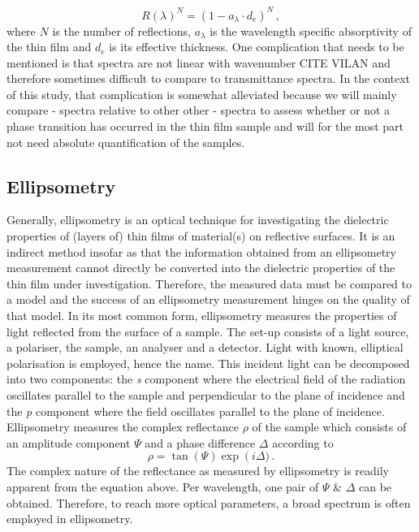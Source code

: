 \begin{equation}
\label{atr-reflectance}
	R(\lambda)^N = (1-a_{\lambda} \cdot d_e)^N \, ,
\end{equation}
where $N$ is the number of reflections, $a_{\lambda}$ is the wavelength specific absorptivity of the thin film and $d_e$ is its effective thickness. One complication that needs to be mentioned is that \atr{} spectra are not linear with wavenumber CITE VILAN and therefore sometimes difficult to compare to transmittance spectra. In the context of this study, that complication is somewhat alleviated because we will mainly compare \atr{}-\ftir{} spectra relative to other other \atr{}-\ftir{} spectra to assess whether or not a phase transition has occurred in the thin film sample and will for the most part not need absolute quantification of the samples.
\subsection{Ellipsometry}
Generally, ellipsometry is an optical technique for investigating the dielectric properties of (layers of) thin films of material(s) on reflective surfaces. It is an indirect method insofar as that the information obtained from an ellipsometry measurement cannot directly be converted into the dielectric properties of the thin film under investigation. Therefore, the measured data must be compared to a model and the success of an ellipsometry measurement hinges on the quality of that model. In its most common form, ellipsometry measures the properties of light reflected from the surface of a sample. The set-up consists of a light source, a polariser, the sample, an analyser and a detector. Light with known, elliptical polarisation is employed, hence the name. This incident light can be decomposed into two components: the \emph{s} component where the electrical field of the radiation oscillates parallel to the sample and perpendicular to the plane of incidence and the \emph{p} component where the field oscillates parallel to the plane of incidence. Ellipsometry measures the complex reflectance $\rho$ of the sample which consists of an amplitude component $\Psi$ and a phase difference $\Delta$ according to
\begin{equation}
	\rho = \tan \left( \Psi \right) \exp \left(i \Delta ) \, .
\end{equation}
The complex nature of the reflectance as measured by ellipsometry is readily apparent from the equation above. Per wavelength, one pair of $\Psi$ \& $\Delta$ can be obtained. Therefore, to reach more optical parameters, a broad spectrum is often employed in ellipsometry.  
